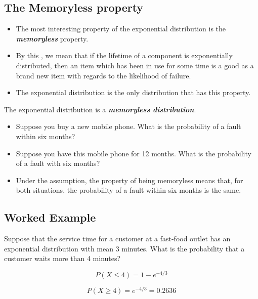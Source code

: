\documentclass[a4paper,12pt]{article}
\begin{document}





\subsection*{The Memoryless property}
\begin{itemize}
\item The most interesting property of the exponential distribution is the \textbf{\emph{memoryless}} property. 
\item By this , we mean that if  the lifetime of a component is exponentially distributed, then an item which has been in use for some time is a good as a brand new item with regards to the likelihood of failure.
\item 
The exponential distribution is the only distribution that has this property.
\end{itemize}

The exponential distribution is a \textbf{\textit{memoryless distribution}}.

\begin{itemize}
\item Suppose you buy a new mobile phone. What is the probability of a fault within six months?

\item Suppose you have this mobile phone for 12 months. What is the probability of a fault with six months?

\item Under the assumption, the property of being memoryless means that, for both situations, the probability of a fault within six months is the same.

\end{itemize}



\subsection*{Worked Example}
Suppose that the service time for a customer at a fast-food outlet
has an exponential distribution with mean 3 minutes. What is the probability that a
customer waits more than 4 minutes?

\[ P(X  \leq 4) = 1 -  e^{-4/3} \]

\[ P(X  \geq 4) = e^{-4/3} = 0.2636 \]

\end{document}
